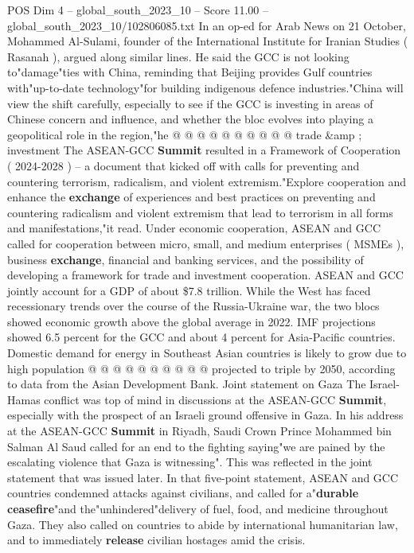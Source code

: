 \begin{textsample}{POS Dim 4 – global\_south\_2023\_10 – Score 11.00 – global\_south\_2023\_10/102806085.txt}
In an op-ed for Arab News on 21 October, Mohammed Al-Sulami, founder of the International Institute for Iranian Studies ( Rasanah ), argued along similar lines.
He said the GCC is not looking to"damage"ties with China, reminding that Beijing provides Gulf countries with"up-to-date technology"for building indigenous defence industries."China will view the shift carefully, especially to see if the GCC is investing in areas of Chinese concern and influence, and whether the bloc evolves into playing a geopolitical role in the region,"he @ @ @ @ @ @ @ @ @ @ trade \&amp ; investment The ASEAN-GCC \textbf{Summit} resulted in a Framework of Cooperation ( 2024-2028 ) -- a document that kicked off with calls for preventing and countering terrorism, radicalism, and violent extremism."Explore cooperation and enhance the \textbf{exchange} of experiences and best practices on preventing and countering radicalism and violent extremism that lead to terrorism in all forms and manifestations,"it read.
Under economic cooperation, ASEAN and GCC called for cooperation between micro, small, and medium enterprises ( MSMEs ), business \textbf{exchange}, financial and banking services, and the possibility of developing a framework for trade and investment cooperation.
ASEAN and GCC jointly account for a GDP of about \$7.8 trillion.
While the West has faced recessionary trends over the course of the Russia-Ukraine war, the two blocs showed economic growth above the global average in 2022.
IMF projections showed 6.5 percent for the GCC and about 4 percent for Asia-Pacific countries.
Domestic demand for energy in Southeast Asian countries is likely to grow due to high population @ @ @ @ @ @ @ @ @ @ projected to triple by 2050, according to data from the Asian Development Bank.
Joint statement on Gaza The Israel-Hamas conflict was top of mind in discussions at the ASEAN-GCC \textbf{Summit}, especially with the prospect of an Israeli ground offensive in Gaza.
In his address at the ASEAN-GCC \textbf{Summit} in Riyadh, Saudi Crown Prince Mohammed bin Salman Al Saud called for an end to the fighting saying"we are pained by the escalating violence that Gaza is witnessing".
This was reflected in the joint statement that was issued later.
In that five-point statement, ASEAN and GCC countries condemned attacks against civilians, and called for a"\textbf{durable} \textbf{ceasefire}"and the"unhindered"delivery of fuel, food, and medicine throughout Gaza.
They also called on countries to abide by international humanitarian law, and to immediately \textbf{release} civilian hostages amid the crisis.

\end{textsample}
